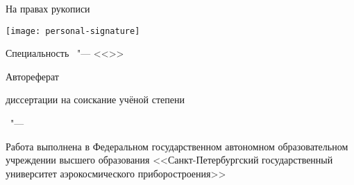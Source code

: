 \thispagestyle{empty}

\vspace{0pt plus1fill} %
\begin{flushright}
  На правах рукописи\par
  \texttt{[image: personal-signature]}
\end{flushright}

\vspace{0pt plus2fill} %
\begin{center}
 \thesisAuthor
\end{center}

\vspace{0pt plus2fill} %
\begin{center}
\textbf { \thesisTitle}

\vspace{0pt plus3fill} %
{ Специальность \thesisSpecialtyNumber\ "--- <<\thesisSpecialtyTitle>>}

\vspace{0pt plus1.5fill} %
Автореферат\par
диссертации на соискание учёной степени\par \thesisDegree
\end{center}

\vspace{0pt plus4fill} %
\begin{center}
{\thesisCity\ "--- \thesisYear}
\end{center}

\newpage
\thispagestyle{empty}
\noindent Работа выполнена в Федеральном государственном автономном образовательном учреждении высшего образования <<Санкт-Петербургский государственный университет аэрокосмического приборостроения>>


